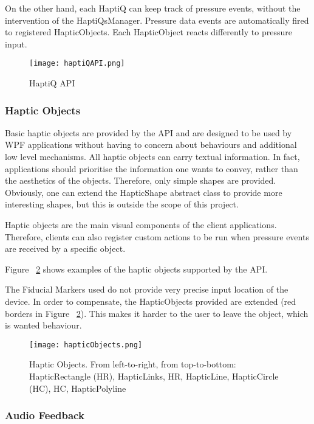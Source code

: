 On the other hand, each HaptiQ can keep track of pressure events, without the intervention of the HaptiQsManager. Pressure data events are automatically fired to registered HapticObjects. Each HapticObject reacts differently to pressure input. 

\begin{figure}[H]
  \centering
  \texttt{[image: haptiQAPI.png]}
  \caption{HaptiQ API}
  \label{fig:haptiQ_api}
\end{figure}

\subsubsection{Haptic Objects}
Basic haptic objects are provided by the API and are designed to be used by WPF applications without having to concern about behaviours and additional low level mechanisms. All haptic objects can carry textual information. In fact, applications should prioritise the information one wants to convey, rather than the aesthetics of the objects. Therefore, only simple shapes are provided. Obviously, one can extend the HapticShape abstract class to provide more interesting shapes, but this is outside the scope of this project.

Haptic objects are the main visual components of the client applications. Therefore, clients can also register custom actions to be run when pressure events are received by a specific object.

Figure ~\ref{fig:hapticObjects} shows examples of the haptic objects supported by the API. 

The Fiducial Markers used do not provide very precise input location of the device. In order to compensate, the HapticObjects provided are extended (red borders in Figure ~\ref{fig:hapticObjects}). This makes it harder to the user to leave the object, which is wanted behaviour.

\begin{figure}[H]
  \centering
  \texttt{[image: hapticObjects.png]}
  \caption{Haptic Objects. From left-to-right, from top-to-bottom: HapticRectangle (HR), HapticLinks, HR, HapticLine, HapticCircle (HC), HC, HapticPolyline}
  \label{fig:hapticObjects}
\end{figure}


\subsubsection{Audio Feedback}


